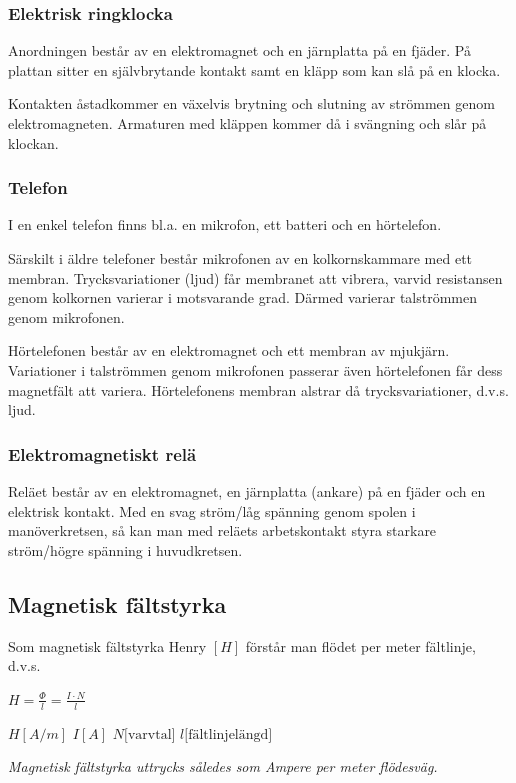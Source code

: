 \subsubsection{Elektrisk ringklocka}
Anordningen består av en elektromagnet och en järnplatta på en fjäder. På plattan
sitter en självbrytande kontakt samt en kläpp som kan slå på en klocka.

Kontakten åstadkommer en växelvis brytning och slutning av strömmen genom
elektromagneten. Armaturen med kläppen kommer då i svängning och slår på klockan.

\subsubsection{Telefon}
I en enkel telefon finns bl.a. en mikrofon, ett batteri och en hörtelefon.

Särskilt i äldre telefoner består mikrofonen av en kolkornskammare med ett membran.
Trycksvariationer (ljud) får membranet att vibrera, varvid resistansen genom kolkornen
varierar i motsvarande grad. Därmed varierar talströmmen genom mikrofonen.

Hörtelefonen består av en elektromagnet och ett membran av mjukjärn. Variationer i
talströmmen genom mikrofonen passerar även hörtelefonen får dess magnetfält att variera.
Hörtelefonens membran alstrar då trycksvariationer, d.v.s. ljud.

\subsubsection{Elektromagnetiskt relä}
Reläet består av en elektromagnet, en järnplatta (ankare) på en fjäder och en elektrisk
kontakt. Med en svag ström/låg spänning genom spolen i manöverkretsen, så kan
man med reläets arbetskontakt styra starkare ström/högre spänning i huvudkretsen.

\subsection{Magnetisk fältstyrka}

Som magnetisk fältstyrka Henry \([H]\) förstår man flödet per meter fältlinje, d.v.s.

\(H = \frac{\Phi}{l} = \frac{I \cdot N}{l}\)

\(H [A/m]\) \(I [A]\) \(N \text{[varvtal]}\) \(l \text{[fältlinjelängd]}\)

\emph{Magnetisk fältstyrka uttrycks således som Ampere per meter flödesväg.}

